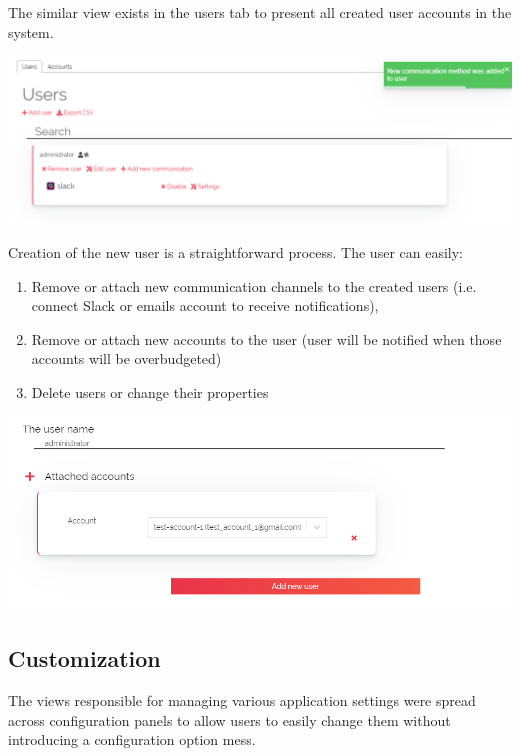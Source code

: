 \documentclass[licencjacka,en]{thesisclass}
\begin{document}
    The similar view exists in the users tab to present all created user accounts in the system.
    
    \includegraphics[width=\textwidth] {imgs/screenshots/screen_users_browse.png}
    
    Creation of the new user is a straightforward process. The user can easily:
    \begin{enumerate}
        \item Remove or attach new communication channels
          to the created users (i.e. connect Slack or emails account to receive notifications),
        \item Remove or attach new accounts to the user
          (user will be notified when those accounts will be overbudgeted)
        \item Delete users or change their properties
    \end{enumerate}
    
    \includegraphics[width=\textwidth] {imgs/screenshots/screen_users_create.png}
    
    \subsection{Customization}
    
    The views responsible for managing various application settings
    were spread across configuration panels to allow users to easily change
    them without introducing a configuration option mess.
    
\end{document}
